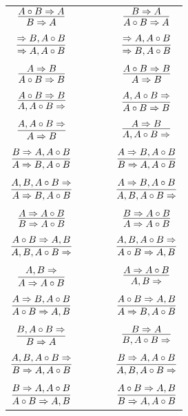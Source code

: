 \documentclass[11pt]{article}
\begin{document}
\begin{center}
\begin{tabular}{ccc}
$\infer{B\Rightarrow A}{A\circ B\Rightarrow A}$ & \ \ \ \ & $\infer{A\circ B\Rightarrow A}{B\Rightarrow A}$ \\
&& \\
$\infer{\Rightarrow A, A\circ B}{\Rightarrow B, A\circ B}$ && $\infer{\Rightarrow B, A\circ B}{\Rightarrow A, A\circ B}$ \\
&& \\
$\infer{A\circ B\Rightarrow B}{A\Rightarrow B}$ && $\infer{A\Rightarrow B}{A\circ B\Rightarrow B}$ \\
&& \\
$\infer{A, A\circ B\Rightarrow }{A\circ B\Rightarrow B}$ && $\infer{A\circ B\Rightarrow B}{A, A\circ B\Rightarrow }$ \\
&& \\
$\infer{A\Rightarrow B}{A, A\circ B\Rightarrow }$ && $\infer{A, A\circ B\Rightarrow }{A\Rightarrow B}$ \\
&& \\
$\infer{A\Rightarrow B, A\circ B}{B\Rightarrow A, A\circ B}$ && $\infer{B\Rightarrow A, A\circ B}{A\Rightarrow B, A\circ B}$ \\
&& \\
$\infer{A\Rightarrow B, A\circ B}{A, B, A\circ B\Rightarrow }$ && $\infer{A, B, A\circ B\Rightarrow }{A\Rightarrow B, A\circ B}$ \\
&& \\
$\infer{B\Rightarrow A\circ B}{A\Rightarrow A\circ B}$ && $\infer{A\Rightarrow A\circ B}{B\Rightarrow A\circ B}$ \\
&& \\
$\infer{A, B, A\circ B\Rightarrow }{A\circ B\Rightarrow A, B}$ && $\infer{A\circ B\Rightarrow A, B}{A, B, A\circ B\Rightarrow }$ \\
&& \\
$\infer{A\Rightarrow A\circ B}{A, B\Rightarrow }$ && $\infer{A, B\Rightarrow }{A\Rightarrow A\circ B}$ \\
&& \\
$\infer{A\circ B\Rightarrow A, B}{A\Rightarrow B, A\circ B}$ && $\infer{A\Rightarrow B, A\circ B}{A\circ B\Rightarrow A, B}$ \\
&& \\
$\infer{B\Rightarrow A}{B, A\circ B\Rightarrow }$ && $\infer{B, A\circ B\Rightarrow }{B\Rightarrow A}$ \\
&& \\
$\infer{B\Rightarrow A, A\circ B}{A, B, A\circ B\Rightarrow }$ && $\infer{A, B, A\circ B\Rightarrow }{B\Rightarrow A, A\circ B}$ \\
&& \\
$\infer{A\circ B\Rightarrow A, B}{B\Rightarrow A, A\circ B}$ && $\infer{B\Rightarrow A, A\circ B}{A\circ B\Rightarrow A, B}$ \\
\end{tabular}


\end{center}
\end{document}
